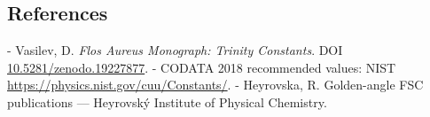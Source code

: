 \subsection{References}

- Vasilev, D. \textit{Flos Aureus Monograph: Trinity Constants}. DOI \href{https://zenodo.org/doi/10.5281/zenodo.19227877}{10.5281/zenodo.19227877}.
- CODATA 2018 recommended values: NIST \href{https://physics.nist.gov/cuu/Constants/}{https://physics.nist.gov/cuu/Constants/}.
- Heyrovska, R. Golden-angle FSC publications --- Heyrovský Institute of Physical Chemistry.

